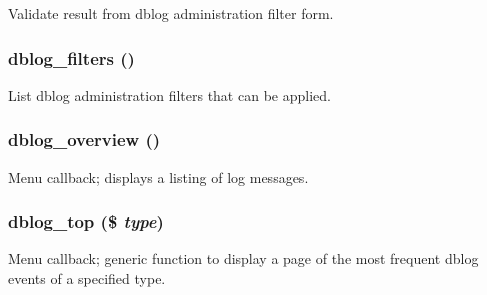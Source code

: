 Validate result from dblog administration filter form. \hypertarget{dblog_8admin_8inc_7f01185081208827159e2cf7546acb83}{
\subsubsection[{dblog\_\-filters}]{\setlength{\rightskip}{0pt plus 5cm}dblog\_\-filters ()}}
\label{dblog_8admin_8inc_7f01185081208827159e2cf7546acb83}


List dblog administration filters that can be applied. \hypertarget{dblog_8admin_8inc_3b74d083df84c683ed01c7a5468eee12}{
\subsubsection[{dblog\_\-overview}]{\setlength{\rightskip}{0pt plus 5cm}dblog\_\-overview ()}}
\label{dblog_8admin_8inc_3b74d083df84c683ed01c7a5468eee12}


Menu callback; displays a listing of log messages. \hypertarget{dblog_8admin_8inc_f0e96daec46eb718e54a9adde8ec9ce1}{
\subsubsection[{dblog\_\-top}]{\setlength{\rightskip}{0pt plus 5cm}dblog\_\-top (\$ {\em type})}}
\label{dblog_8admin_8inc_f0e96daec46eb718e54a9adde8ec9ce1}


Menu callback; generic function to display a page of the most frequent dblog events of a specified type. 